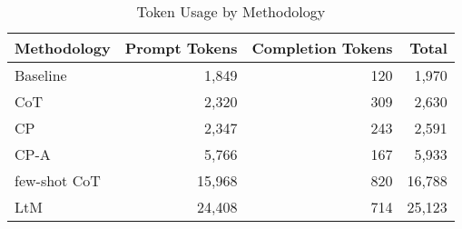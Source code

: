 \begin{table}[htbp]
\centering
\caption{Token Usage by Methodology}
\label{tab:token-usage}
\begin{tabular}{lrrr}
\toprule
Methodology & Prompt Tokens & Completion Tokens & Total \\
\midrule
Baseline & 1,849 & 120 & 1,970 \\
CoT & 2,320 & 309 & 2,630 \\
CP & 2,347 & 243 & 2,591 \\
CP-A & 5,766 & 167 & 5,933 \\
few-shot CoT & 15,968 & 820 & 16,788 \\
LtM & 24,408 & 714 & 25,123 \\
\bottomrule
\end{tabular}
\end{table}